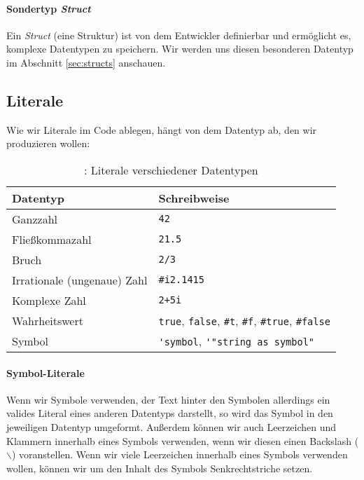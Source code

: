 	\paragraph{Sondertyp \textit{Struct}}
		Ein \textit{Struct} (eine Struktur) ist von dem Entwickler definierbar und ermöglicht es, komplexe Datentypen zu speichern. Wir werden uns diesen besonderen Datentyp im Abschnitt \ref{sec:structs} anschauen.

\subsection{Literale}
	
	Wie wir Literale im Code ablegen, hängt von dem Datentyp ab, den wir produzieren wollen:
	
	\begin{table}[H]
		\centering
		\begin{tabular}{l | l}
			\textbf{Datentyp} & \textbf{Schreibweise} \\ \hline
			Ganzzahl & \lstinline[language = Racket]|42| \\
			Fließkommazahl & \lstinline[language = Racket]|21.5| \\
			Bruch & \lstinline[language = Racket]|2/3| \\
			Irrationale (ungenaue) Zahl & \lstinline[language = Racket]|#i2.1415| \\
			Komplexe Zahl & \lstinline[language = Racket]|2+5i| \\
			Wahrheitswert & \lstinline[language = Racket]|true|, \lstinline[language = Racket]|false|, \lstinline[language = Racket]|#t|, \lstinline[language = Racket]|#f|, \lstinline[language = Racket]|#true|, \lstinline[language = Racket]|#false| \\
			Symbol & \lstinline[language = Racket]|'symbol|, \lstinline[language = Racket]|'"string as symbol"| \\
		\end{tabular}
		\caption{\racket: Literale verschiedener Datentypen}
	\end{table}

	\paragraph{Symbol-Literale}
		Wenn wir Symbole verwenden, der Text hinter den Symbolen allerdings ein valides Literal eines anderen Datentyps darstellt, so wird das Symbol in den jeweiligen Datentyp umgeformt. Außerdem können wir auch Leerzeichen und Klammern innerhalb eines Symbols verwenden, wenn wir diesen einen Backslash (\(\backslash\)) voranstellen. Wenn wir viele Leerzeichen innerhalb eines Symbols verwenden wollen, können wir um den Inhalt des Symbols Senkrechtstriche setzen.
		

